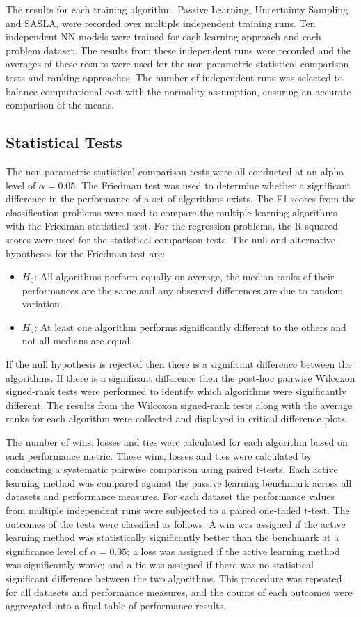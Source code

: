 \documentclass[conference]{IEEEtran}
\begin{document}
	The results for each training algorithm, Passive Learning, Uncertainty Sampling and SASLA, were recorded over multiple independent training runs. Ten independent NN models were trained for each learning approach and each problem dataset. The results from these independent runs were recorded and the averages of these results were used for the non-parametric statistical comparison tests and ranking approaches. The number of independent runs was selected to balance computational cost with the normality assumption, ensuring an accurate comparison of the means.
	
	\subsection{Statistical Tests}
	The non-parametric statistical comparison tests were all conducted at an alpha level of $\alpha=0.05$. The Friedman test was used to determine whether a significant difference in the performance of a set of algorithms exists. The F1 scores from the classification problems were used to compare the multiple learning algorithms with the Friedman statistical test. For the regression problems, the R-squared scores were used for the statistical comparison tests. The null and alternative hypotheses for the Friedman test are:
	\begin{itemize}
		\item $H_0$: All algorithms perform equally on average, the median ranks of their performances are the same and any observed differences are due to random variation.
		\item $H_a$: At least one algorithm performs significantly different to the others and not all medians are equal.
	\end{itemize}
	If the null hypothesis is rejected then there is a significant difference between the algorithms. If there is a significant difference then the post-hoc pairwise Wilcoxon signed-rank tests were performed to identify which algorithms were significantly different. The results from the Wilcoxon signed-rank tests along with the average ranks for each algorithm were collected and displayed in critical difference plots.
	
	The number of wins, losses and ties were calculated for each algorithm based on each performance metric. These wins, losses and ties were calculated by conducting a systematic pairwise comparison using paired t-tests. Each active learning method was compared against the passive learning benchmark across all datasets and performance measures. For each dataset the performance values from multiple independent runs were subjected to a paired one-tailed t-test. The outcomes of the tests were classified as follows: A win was assigned if the active learning method was statistically significantly better than the benchmark at a significance level of $\alpha=0.05$; a loss was assigned if the active learning method was significantly worse; and a tie was assigned if there was no statistical significant difference between the two algorithms. This procedure was repeated for all datasets and performance measures, and the counts of each outcomes were aggregated into a final table of performance results.
	
\end{document}
